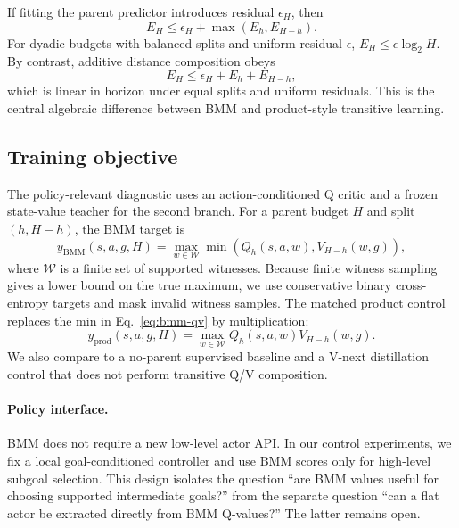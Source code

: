 \documentclass[11pt]{article}
\begin{document}
If fitting the parent predictor introduces residual $\epsilon_H$, then
\begin{equation}
    E_H \le \epsilon_H + \max(E_h,E_{H-h}).
\end{equation}
For dyadic budgets with balanced splits and uniform residual $\epsilon$,
$E_H\le \epsilon\log_2 H$. By contrast, additive distance composition obeys
\begin{equation}
    E_H \le \epsilon_H+E_h+E_{H-h},
\end{equation}
which is linear in horizon under equal splits and uniform residuals. This is the
central algebraic difference between BMM and product-style transitive learning.

\subsection{Training objective}

The policy-relevant diagnostic uses an action-conditioned Q critic and a frozen
state-value teacher for the second branch. For a parent budget $H$ and split
$(h,H-h)$, the BMM target is
\begin{equation}
    y_{\mathrm{BMM}}(s,a,g,H)=
    \max_{w\in\mathcal{W}} \min\left(Q_h(s,a,w),V_{H-h}(w,g)\right),
    \label{eq:bmm-qv}
\end{equation}
where $\mathcal{W}$ is a finite set of supported witnesses. Because finite
witness sampling gives a lower bound on the true maximum, we use conservative
binary cross-entropy targets and mask invalid witness samples. The matched
product control replaces the min in Eq.~\ref{eq:bmm-qv} by multiplication:
\begin{equation}
    y_{\mathrm{prod}}(s,a,g,H)=
    \max_{w\in\mathcal{W}} Q_h(s,a,w)V_{H-h}(w,g).
\end{equation}
We also compare to a no-parent supervised baseline and a V-next distillation
control that does not perform transitive Q/V composition.

\paragraph{Policy interface.}
BMM does not require a new low-level actor API. In our control experiments, we
fix a local goal-conditioned controller and use BMM scores only for high-level
subgoal selection. This design isolates the question ``are BMM values useful for
choosing supported intermediate goals?'' from the separate question ``can a flat
actor be extracted directly from BMM Q-values?'' The latter remains open.
\end{document}
